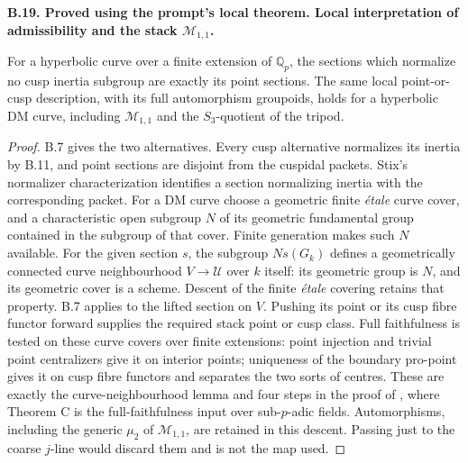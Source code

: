 \documentclass[11pt,oneside]{article}
\makeatletter
\newcounter{statementanchor}
\newenvironment{statement}[3]{%
 \refstepcounter{statementanchor}\def\@currentlabel{#1}%
 \par\addvspace{9pt}\noindent
 \textbf{#1. #2. #3.}\par\nobreak\noindent\ignorespaces
}{\par\addvspace{5pt}}
\makeatother
\begin{document}
\begin{statement}{B.19}{Proved using the prompt's local theorem}{Local interpretation of admissibility and the stack $\mathcal M_{1,1}$}
\label{st:B.19}

For a hyperbolic curve over a finite extension of $\mathbb Q_p$, the
sections which normalize no cusp inertia subgroup are exactly its
point sections.  The same local point-or-cusp description, with its
full automorphism groupoids, holds for a hyperbolic DM curve, including
$\mathcal M_{1,1}$ and the $S_3$-quotient of the tripod.
\end{statement}
\begin{proof}
B.7 gives the two alternatives.  Every cusp alternative normalizes
its inertia by B.11, and point sections are disjoint from the
cuspidal packets.  Stix's normalizer characterization identifies a
section normalizing inertia with the corresponding packet.
For a DM curve choose a geometric finite \emph{\'etale} curve cover,
and a characteristic open subgroup $N$ of its geometric fundamental
group contained in the subgroup of that cover.  Finite generation
makes such $N$ available.  For the given section $s$, the subgroup
$Ns(G_k)$ defines a geometrically connected curve neighbourhood
$V\to\mathcal U$ over $k$ itself: its geometric group is $N$,
and its geometric cover is a scheme.  Descent of the finite
\emph{\'etale} covering retains that property.  B.7 applies to the
lifted section on $V$.  Pushing its point or its cusp fibre functor
forward supplies the required stack point or cusp class.
Full faithfulness is tested on these curve covers over finite
extensions: point injection and trivial point centralizers give it
on interior points; uniqueness of the boundary pro-point gives it
on cusp fibre functors and separates the two sorts of centres.
These are exactly the curve-neighbourhood lemma and four steps in
the proof of
\cite[Theorems B and C]{B_Steklov}, where Theorem C is the
full-faithfulness input over sub-$p$-adic fields.
Automorphisms, including the generic $\mu_2$ of
$\mathcal M_{1,1}$, are retained in this descent.  Passing just to
the coarse $j$-line would discard them and is not the map used.
\end{proof}
\end{document}
